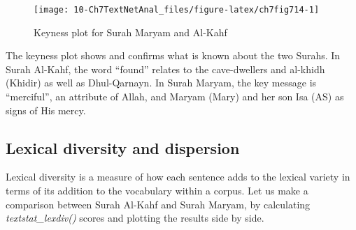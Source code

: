 \documentclass[
]{article}
\begin{document}
\begin{figure}

{\centering \texttt{[image: 10-Ch7TextNetAnal\_files/figure-latex/ch7fig714-1]} 

}

\caption{Keyness plot for Surah Maryam and Al-Kahf}\label{fig:ch7fig714}
\end{figure}

The keyness plot shows and confirms what is known about the two Surahs. In Surah Al-Kahf, the word ``found'' relates to the cave-dwellers and al-khidh (Khidir) as well as Dhul-Qarnayn. In Surah Maryam, the key message is ``merciful'', an attribute of Allah, and Maryam (Mary) and her son Isa (AS) as signs of His mercy.

\hypertarget{lexical-diversity-and-dispersion}{%
\subsection{Lexical diversity and dispersion}\label{lexical-diversity-and-dispersion}}

Lexical diversity is a measure of how each sentence adds to the lexical variety in terms of its addition to the vocabulary within a corpus. Let us make a comparison between Surah Al-Kahf and Surah Maryam, by calculating \emph{textstat\_lexdiv()} scores and plotting the results side by side.
\end{document}
